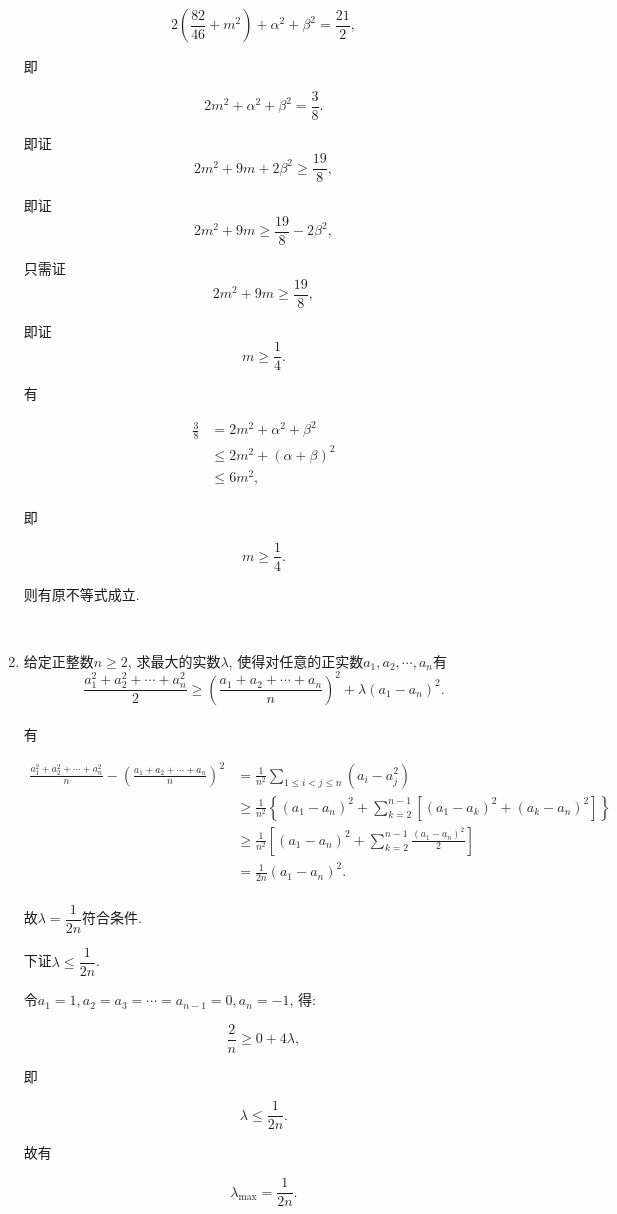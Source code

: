 \documentclass[8pt]{article}
\begin{document}
\begin{enumerate}
			$$2\left(\frac{82}{46}+m^2\right)+\alpha^2+\beta^2=\frac{21}{2},$$

			即

			$$2m^2+\alpha^2+\beta^2=\frac{3}{8}.$$

			即证$$2m^2+9m+2\beta^2 \geq \frac{19}{8},$$

			即证$$2m^2+9m\geq\frac{19}{8}-2\beta^2,$$

			只需证$$2m^2+9m\geq \frac{19}{8},$$

			即证$$m\geq\frac{1}{4}.$$

			有

			\begin{align*}
				\frac{3}{8} &= 2m^2+\alpha^2+\beta^2 \\
				            &\leq 2m^2+(\alpha + \beta)^2\\
				            &\leq 6m^2,\\
			\end{align*}

			即

			$$m\geq\frac{1}{4}.$$

			则有原不等式成立.

		~\\

		\item 给定正整数$n\geq 2$, 求最大的实数$\lambda$, 使得对任意的正实数$a_1, a_2, \cdots, a_n$有$$\frac{a_1^2 + a_2^2 + \cdots + a_n^2}{2} \geq \left(\frac{a_1 + a_2 + \cdots + a_n}{n}\right)^2 + \lambda (a_1 - a_n)^2.$$
			~\\

			有

			\begin{align*}
				\frac{a_1^2 + a_2^2 + \cdots + a_n^2}{n} - \left(\frac{a_1 + a_2 + \cdots + a_n}{n}\right)^2 &= \frac{1}{n^2} \sum_{1\leq i<j \leq n} (a_i - a_j^2)\\
				&\geq \frac{1}{n^2} \left\{(a_1-a_n)^2 + \sum_{k=2}^{n-1} \left[(a_1 - a_k)^2 + (a_k - a_n)^2\right]\right\}\\
				&\geq \frac{1}{n^2} \left[(a_1 - a_n)^2 + \sum_{k=2}^{n-1} \frac{(a_1-a_n)^2}{2}\right]\\
				&= \frac{1}{2n} (a_1 - a_n) ^ 2.\\
			\end{align*}

			故$\lambda = \dfrac{1}{2n}$符合条件.

			下证$\lambda \leq \dfrac{1}{2n}$.

			令$a_1 = 1, a_2 = a_3 = \cdots = a_{n-1} = 0, a_n = -1$, 得:

			$$\frac{2}{n} \geq 0+4\lambda,$$

			即

			$$\lambda \leq \frac{1}{2n}.$$

			故有

			$$\lambda_{\max}=\frac{1}{2n}.$$

	\end{enumerate}
\end{document}
